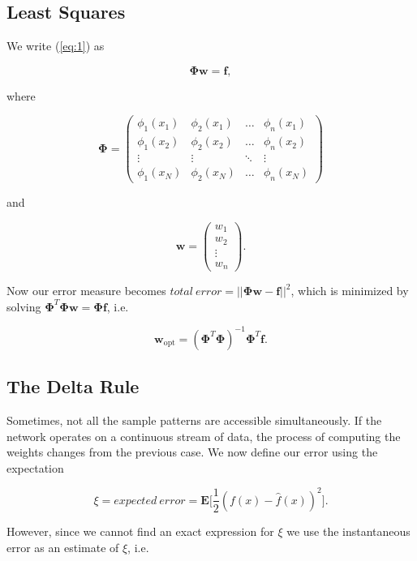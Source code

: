 \documentclass[letterpaper, 10 pt, conference]{ieeeconf}  %
\begin{document}
\subsection{Least Squares}

We write (\ref{eq:1}) as

$$
\boldsymbol{\Phi}\textbf{w} = \textbf{f},
$$

where

\begin{equation} \nonumber
\boldsymbol{\Phi} = 
\begin{pmatrix}
\phi_1(x_1) & \phi_2(x_1) & \dots & \phi_n(x_1)\\
\phi_1(x_2) & \phi_2(x_2) & \dots & \phi_n(x_2) \\
\vdots & \vdots & \ddots & \vdots \\
\phi_1(x_N) & \phi_2(x_N) & \dots & \phi_n(x_N)
\end{pmatrix}
\end{equation}

and

\begin{equation}
\textbf{w} = 
\begin{pmatrix}
w_1 \\
w_2 \\
\vdots \\
w_n
\end{pmatrix}.
\end{equation}

Now our error measure becomes $total~error = || \boldsymbol{\Phi}\textbf{w} - \textbf{f}||^2$, which is minimized by solving $ \boldsymbol{\Phi}^T \boldsymbol{\Phi}\textbf{w} = \boldsymbol{\Phi} \textbf{f}$, i.e.

$$
\textbf{w}_\text{opt} = (\boldsymbol{\Phi}^T \boldsymbol{\Phi})^{-1}\boldsymbol{\Phi}^T \textbf{f}.
$$

\subsection{The Delta Rule}
Sometimes, not all the sample patterns are accessible simultaneously.  If the network operates on a continuous stream of data,  the process of computing the weights changes from the previous case. We now define our error using the expectation

$$
\xi = expected~error= \textbf{E}\Big[ \frac{1}{2} (f(x) - \hat{f}(x))^2\Big].
$$

However, since we cannot find an exact expression for $\xi$ we use the instantaneous error as an estimate of $\xi$, i.e.
\end{document}
